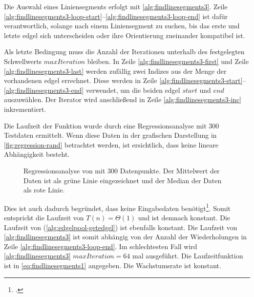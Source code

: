 Die Auswahl eines Liniensegments erfolgt mit \autoref{alg:findlinesegments3}. Zeile
 \ref{alg:findlinesegments3-loop-start}--\ref{alg:findlinesegments3-loop-end} ist dafür verantwortlich, solange nach
 einem Liniensegment zu suchen, bis das erste und letzte \gls{edgel} sich unterscheiden oder ihre Orientierung
 zueinander kompatibel ist.

Als letzte Bedingung muss die Anzahl der Iterationen unterhalb des festgelegten Schwellwerts $\mathit{maxIteration}$
 bleiben. In Zeile \ref{alg:findlinesegments3-first} und Zeile \ref{alg:findlinesegments3-last} werden zufällig zwei
 Indizes aus der Menge der vorhandenen \gls{edgel} errechnet. Diese werden in Zeile
 \ref{alg:findlinesegments3-start}--\ref{alg:findlinesegments3-end} verwendet, um die beiden \gls{edgel}
 $\mathit{start}$ und $\mathit{end}$ auszuwählen. Der Iterator wird anschließend in Zeile
 \ref{alg:findlinesegments3-inc} inkrementiert.

Die Laufzeit der Funktion  wurde durch eine Regressionsanalyse mit $300$ Testdaten ermittelt. Wenn diese
 Daten in der grafischen Darstellung in \autoref{fig:regression-rand} betrachtet werden, ist ersichtlich, dass keine
 lineare Abhängigkeit besteht.
\begin{figure}[!ht]
	\centering
	
	\caption{Regressionsanalyse von  mit $300$ Datenpunkte. Der Mittelwert der Daten ist als grüne Linie
	 eingezeichnet und der Median der Daten als rote Linie.}
	\label{fig:regression-rand}
\end{figure}
Dies ist auch dadurch begründet, dass  keine Eingabedaten benötigt\footcite[Vgl.][]{rand}. Somit
 entspricht die Laufzeit von  $T(n) = \Theta(1)$ und ist demnach konstant. Die Laufzeit von
  (\autoref{alg:edgelpool-getedgel}) ist ebenfalls konstant. Die Laufzeit von
 \autoref{alg:findlinesegments3} ist somit abhängig von der Anzahl der Wiederholungen in Zeile
 \ref{alg:findlinesegments3-loop-end}. Im schlechtesten Fall wird \autoref{alg:findlinesegments3}
 $\mathit{maxIteration} = 64$ mal ausgeführt. Die Laufzeitfunktion ist in \autoref{eq:findlinesegments1} angegeben. Die
 Wachstumsrate ist konstant.


